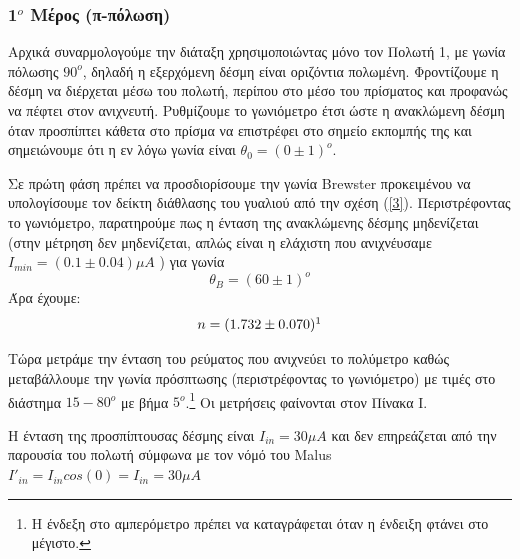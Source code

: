 \documentclass[a4paper]{article}
\begin{document}
\subsubsection*{1$^o$ Μέρος (π-πόλωση)}
Αρχικά συναρμολογούμε την διάταξη χρησιμοποιώντας μόνο τον Πολωτή 1, με γωνία πόλωσης $90^o$, δηλαδή η εξερχόμενη δέσμη είναι οριζόντια πολωμένη. Φροντίζουμε η δέσμη να διέρχεται μέσω του πολωτή, περίπου στο μέσο του πρίσματος και προφανώς να πέφτει στον ανιχνευτή. Ρυθμίζουμε το γωνιόμετρο έτσι ώστε η ανακλώμενη δέσμη όταν προσπίπτει κάθετα στο πρίσμα να επιστρέφει στο σημείο εκπομπής της και σημειώνουμε ότι η εν λόγω γωνία είναι $\theta_0 = (0\pm 1)^o$.

Σε πρώτη φάση πρέπει να προσδιορίσουμε την γωνία Brewster προκειμένου να υπολογίσουμε τον δείκτη διάθλασης του γυαλιού από την σχέση  (\ref{3}). Περιστρέφοντας το γωνιόμετρο, παρατηρούμε πως η ένταση της ανακλώμενης δέσμης μηδενίζεται (στην μέτρηση δεν μηδενίζεται, απλώς είναι η ελάχιστη που ανιχνέυσαμε $I_{min}=(0.1\pm0.04)\mu A$ ) για γωνία 
$$ \theta_B = (60\pm1)^o$$
Άρα έχουμε: 
$$n = (1.732 \pm 0.070 ) \footnotemark$$



Τώρα μετράμε την ένταση του ρεύματος που ανιχνεύει το πολύμετρο καθώς μεταβάλλουμε την γωνία πρόσπτωσης (περιστρέφοντας το γωνιόμετρο) με τιμές στο διάστημα $15-80^o$ με βήμα $5^o$.\footnote{Η ένδεξη στο αμπερόμετρο πρέπει να καταγράφεται όταν η ένδειξη φτάνει στο μέγιστο.}
Οι μετρήσεις φαίνονται στον Πίνακα Ι. \footnotemark



 Η ένταση της προσπίπτουσας δέσμης είναι $I_{in} = 30\mu A$ και δεν επηρεάζεται από την παρουσία του πολωτή σύμφωνα με τον νόμό του Malus $I'_{in}=I_{in} cos(0) = I_{in} = 30\mu A$
\end{document}
